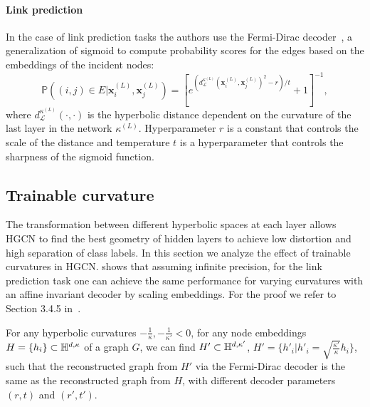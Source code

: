 \paragraph{Link prediction}\label{sec:linkPredictionHGCN}
In the case of link prediction tasks the authors use the Fermi-Dirac decoder~\cite{Krioukov2010HyperbolicGeometryComplexNetworks}\cite{nickel2017poincare}, a generalization of sigmoid to compute probability scores for the edges based on the embeddings of the incident nodes:
\begin{equation*}
    \mathbb{P}\left((i, j) \in E|\mathbf{x}_i^{(L)}, \mathbf{x}_j^{(L)}\right) = \left[e^{(d^{\kappa^{(L)}}_{\mathcal{L}}(\mathbf{x}^{(L)}_i, \mathbf{x}^{(L)}_j)^2-r)/t} + 1\right]^{-1},
\end{equation*}
where $d^{\kappa^{(L)}}_{\mathcal{L}}(\cdot, \cdot)$ is the hyperbolic distance dependent on the curvature of the last layer in the network $\kappa^{(L)}$. Hyperparameter $r$ is a constant that controls the scale of the distance and temperature $t$ is a hyperparameter that controls the sharpness of the sigmoid function.

\subsection{Trainable curvature}
The transformation between different hyperbolic spaces at each layer allows HGCN to find the best geometry of hidden layers to achieve low distortion and high separation of class labels. In this section we analyze the effect of trainable curvatures in HGCN.  shows that assuming infinite precision, for the link prediction task one can achieve the same performance for varying curvatures with an affine invariant decoder by scaling embeddings. For the proof we refer to Section 3.4.5 in~\cite{Chami2021representationLearningAlgorithmsHyperbolicSpaces}.

\begin{theorem}\label{th:HGCNcurvature}
    For any hyperbolic curvatures $-\frac{1}{\kappa}, -\frac{1}{\kappa'} < 0$, for any node embeddings $H = \{h_i\} \subset \mathbb{H}^{d,\kappa}$ of a graph $G$, we can find $H' \subset \mathbb{H}^{d,\kappa'}$, $H' = \{h'_i | h'_i = \sqrt{\frac{\kappa'}{\kappa}}h_i\}$, such that the reconstructed graph from $H'$ via the Fermi-Dirac decoder is the same as the reconstructed graph from $H$, with different decoder parameters $(r, t)$ and $(r', t')$.    
\end{theorem}

